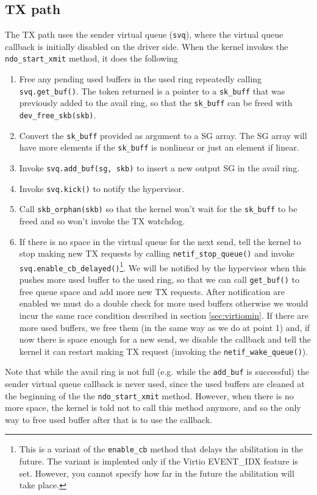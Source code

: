 \subsection{TX path}
\label{sec:virtionet-tx}
The TX path uses the sender virtual queue (\texttt{svq}), where the virtual queue callback is initially disabled on the driver side.
When the kernel invokes the \texttt{ndo\_start\_xmit} method, it does the following
\begin{enumerate}
  \item Free any pending used buffers in the used ring repeatedly calling \texttt{svq.get\_buf()}. The token returned is a pointer to a
	\texttt{sk\_buff} that was previously added to the avail ring, so that the \texttt{sk\_buff} can be freed with
	\texttt{dev\_free\_skb(skb)}.
  \item Convert the \texttt{sk\_buff} provided as argument to a SG array. The SG array will have more elements if the
	\texttt{sk\_buff} is nonlinear or just an element if linear.
  \item Invoke \texttt{svq.add\_buf(sg, skb)} to insert a new output SG in the avail ring.
  \item Invoke \texttt{svq.kick()} to notify the hypervisor.
  \item Call \texttt{skb\_orphan(skb)} so that the kernel won't wait for the \texttt{sk\_buff} to be freed and so won't invoke the
	TX watchdog.
  \item If there is no space in the virtual queue for the next send, tell the kernel to stop making new TX requests by calling
	\texttt{netif\_stop\_queue()} and invoke \texttt{svq.enable\_cb\_delayed()}\footnote{This is a variant of the \texttt{enable\_cb}
	method that delays the abilitation in the future. The variant is implented only if the Virtio EVENT\_IDX feature is set. However,
	you cannot specify how far in the future the abilitation will take place.}.
	We will be notified by the hypervisor when this pushes more used buffer to the used ring, so that we can call \texttt{get\_buf()}
	to free queue space and add more new TX requests.
	After notification are enabled we must do a double check for more used buffers otherwise we would incur the same race condition
	described in section \ref{sec:virtiomin}. If there are more used buffers, we free them (in the same way as we do at point 1) and,
	if now there is space enough for a new send, we disable the callback and tell the kernel it can restart making TX request (invoking
	the \texttt{netif\_wake\_queue()}).
\end{enumerate}
Note that while the avail ring is not full (e.g. while the \texttt{add\_buf} is successful) the sender virtual queue callback is never used,
since the used buffers are cleaned at the beginning of the the \texttt{ndo\_start\_xmit} method.
However, when there is no more space, the kernel is told not to call this method anymore, and so the only way to free used buffer after that
is to use the callback.

